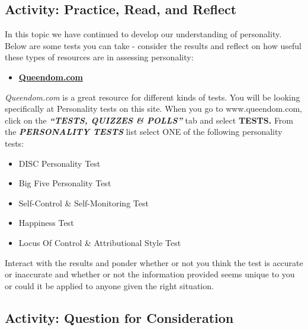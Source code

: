 \documentclass[
]{book}
\providecommand{\tightlist}{%
  \setlength{\itemsep}{0pt}\setlength{\parskip}{0pt}}
\begin{document}
\hypertarget{activity-practice-read-and-reflect}{%
\subsection*{Activity: Practice, Read, and Reflect}\label{activity-practice-read-and-reflect}}

\begin{reflect}
In this topic we have continued to develop our understanding of personality. Below are some tests you can take - consider the results and reflect on how useful these types of resources are in assessing personality:

\begin{itemize}
\tightlist
\item
  \href{https://www.queendom.com/}{\textbf{Queendom.com}}
\end{itemize}

\emph{Queendom.com} is a great resource for different kinds of tests. You will be looking specifically at Personality tests on this site. When you go to www.queendom.com, click on the \textbf{\emph{``TESTS, QUIZZES \& POLLS''}} tab and select \textbf{TESTS.} From the \textbf{\emph{PERSONALITY TESTS}} list select ONE of the following personality tests:

\begin{itemize}
\tightlist
\item
  DISC Personality Test\\
\item
  Big Five Personality Test\\
\item
  Self-Control \& Self-Monitoring Test\\
\item
  Happiness Test\\
\item
  Locus Of Control \& Attributional Style Test
\end{itemize}

Interact with the results and ponder whether or not you think the test is accurate or inaccurate and whether or not the information provided seems unique to you or could it be applied to anyone given the right situation.
\end{reflect}

\hypertarget{activity-question-for-consideration-3}{%
\subsection*{Activity: Question for Consideration}\label{activity-question-for-consideration-3}}
\end{document}
